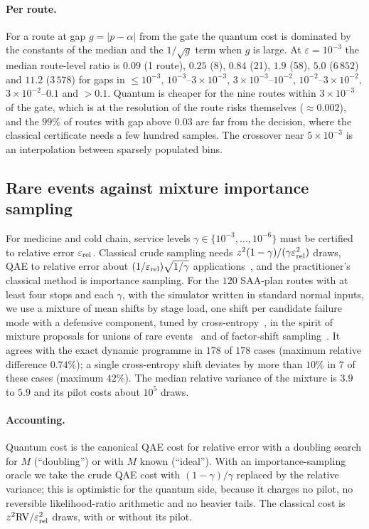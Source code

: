 \documentclass[pdflatex,sn-mathphys-num]{sn-jnl}
\theoremstyle{thmstyleone}
\theoremstyle{thmstyletwo}
\begin{document}
\paragraph{Per route.} For a route at gap $g=|p-\alpha|$ from the gate the quantum cost is dominated by the constants of the median and the $1/\sqrt g$ term when $g$ is large. At $\varepsilon=10^{-3}$ the median route-level ratio is $0.09$ (1 route), $0.25$ (8), $0.84$ (21), $1.9$ (58), $5.0$ ($6\,852$) and $11.2$ ($3\,578$) for gaps in $\le10^{-3}$, $10^{-3}$--$3\times10^{-3}$, $3\times10^{-3}$--$10^{-2}$, $10^{-2}$--$3\times10^{-2}$, $3\times10^{-2}$--$0.1$ and $>0.1$. Quantum is cheaper for the nine routes within $3\times10^{-3}$ of the gate, which is at the resolution of the route risks themselves ($\approx0.002$), and the $99\%$ of routes with gap above $0.03$ are far from the decision, where the classical certificate needs a few hundred samples. The crossover near $5\times10^{-3}$ is an interpolation between sparsely populated bins.

\subsection{Rare events against mixture importance sampling}\label{sec:rare}
For medicine and cold chain, service levels $\gamma\in\{10^{-3},\dots,10^{-6}\}$ must be certified to relative error $\varepsilon_{\rm rel}$. Classical crude sampling needs $z^2(1-\gamma)/(\gamma\varepsilon_{\rm rel}^2)$ draws, QAE to relative error about $(1/\varepsilon_{\rm rel})\sqrt{1/\gamma}$ applications~\cite{Brassard2002}, and the practitioner's classical method is importance sampling. For the $120$ SAA-plan routes with at least four stops and each $\gamma$, with the simulator written in standard normal inputs, we use a mixture of mean shifts by stage load, one shift per candidate failure mode with a defensive component, tuned by cross-entropy~\cite{deBoer2005}, in the spirit of mixture proposals for unions of rare events~\cite{Owen2019} and of factor-shift sampling~\cite{Glasserman2005}. It agrees with the exact dynamic programme in $178$ of $178$ cases (maximum relative difference $0.74\%$); a single cross-entropy shift deviates by more than $10\%$ in $7$ of these cases (maximum $42\%$). The median relative variance of the mixture is $3.9$ to $5.9$ and its pilot costs about $10^5$ draws.

\paragraph{Accounting.} Quantum cost is the canonical QAE cost for relative error with a doubling search for $M$ (``doubling'') or with $M$ known (``ideal''). With an importance-sampling oracle we take the crude QAE cost with $(1-\gamma)/\gamma$ replaced by the relative variance; this is optimistic for the quantum side, because it charges no pilot, no reversible likelihood-ratio arithmetic and no heavier tails. The classical cost is $z^2\mathrm{RV}/\varepsilon_{\rm rel}^2$ draws, with or without its pilot.
\end{document}
